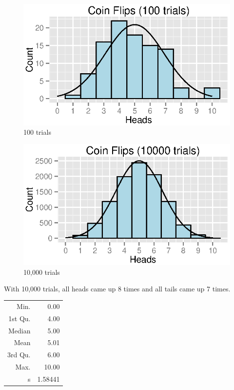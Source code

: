\documentclass{exam}
\begin{document}
  \begin{figure}[H]
    \centering
    \includegraphics{figures/coins/100_10.eps}
    \caption{100 trials}
  \end{figure}

  \begin{figure}[H]
    \centering
    \includegraphics{figures/coins/10000_10.eps}
    \caption{10,000 trials}
  \end{figure}

  With 10,000 trials, all heads came up 8 times and all tails came up 7 times.

  \begin{table}[ht]
    \centering
    \begin{tabular}{rr}
      \toprule
      Min.    & 0.00 \\
      1st Qu. & 4.00 \\
      Median  & 5.00 \\
      Mean    & 5.01 \\
      3rd Qu. & 6.00 \\
      Max.    & 10.00 \\
      s       & 1.58441 \\
      \bottomrule
    \end{tabular}
  \end{table}
\end{document}
